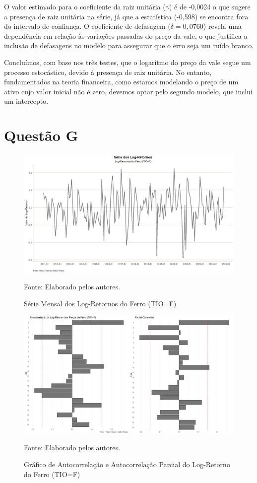 \documentclass[a4paper,12pt]{article}[abntex2]
\begin{document}
O valor estimado para o coeficiente da raiz unitária ($\gamma$) é de -0,0024 o que sugere a presença de raiz unitária na série, já que a estatística (-0,598) se encontra fora do intervalo de confiança. O coeficiente de defasagem ($\delta = 0,0760$) revela uma dependência em relação às variações passadas do preço da vale, o que justifica a inclusão de defasagens no modelo para assegurar que o erro seja um ruído branco.

Concluímos, com base nos três testes, que o logaritmo do preço da vale segue um processo estocástico, devido à presença de raiz unitária. No entanto, fundamentados na teoria financeira, como estamos modelando o preço de um ativo cujo valor inicial não é zero, devemos optar pelo segundo modelo, que inclui um intercepto.

\section*{\textbf{Questão G}}

\begin{figure}[H]
    \centering
    \caption{Série Mensal dos Log-Retornos do Ferro (TIO=F)} 
    \includegraphics[width=1.0\textwidth]{APS 2/i1qG.png}
    \label{fig:i1qG}
    
    \footnotesize{Fonte: Elaborado pelos autores.}
    \end{figure}

\begin{figure}[H]
    \centering
    \caption{Gráfico de Autocorrelação e Autocorrelação Parcial do Log-Retorno do Ferro (TIO=F)} 
    \includegraphics[width=1.0\textwidth]{APS 2/i2qG.png}
    \label{fig:i2qG}
    
    \footnotesize{Fonte: Elaborado pelos autores.}
    \end{figure}
\end{document}
